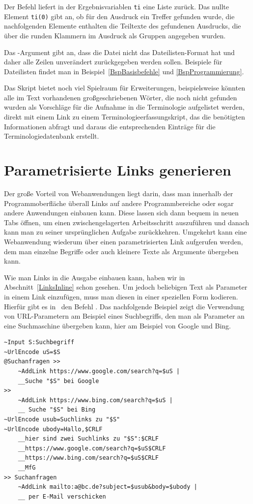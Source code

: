 Der Befehl  liefert in der Ergebnisvariablen \verb|ti| eine Liste zurück. Das nullte Element \verb|ti(0)| gibt an, ob für den Ausdruck ein Treffer gefunden wurde, die nachfolgenden Elemente enthalten die Teiltexte des gefundenen Ausdrucks, die über die runden Klammern im Ausdruck als Gruppen angegeben wurden.

Das -Argument gibt an, dass die Datei nicht das Dateilisten-Format hat und daher alle Zeilen unverändert zurückgegeben werden sollen. Beispiele für Dateilisten findet man in Beispiel~\ref{BspBasisbefehle} und \ref{BspProgrammierung}.

Das Skript bietet noch viel Spielraum für Erweiterungen, beispielsweise könnten alle im Text vorhandenen großgeschriebenen Wörter, die noch nicht gefunden wurden als Vorschläge für die Aufnahme in die Terminologie aufgelistet werden, direkt mit einem Link zu einem Terminologieerfassungskript, das die benötigten Informationen abfragt und daraus die entsprechenden Einträge für die Terminologiedatenbank erstellt.

\section{Parametrisierte Links generieren}\label{ParametrisierteLinks}
Der große Vorteil von Webanwendungen liegt darin, dass man innerhalb der Programmoberfläche überall Links auf andere Programmbereiche oder sogar andere Anwendungen einbauen kann. Diese lassen sich dann bequem in neuen Tabs öffnen, um einen zwischengelagerten Arbeitsschritt auszuführen und danach kann man zu seiner ursprünglichen Aufgabe zurückkehren. Umgekehrt kann eine Webanwendung wiederum über einen parametrisierten Link aufgerufen werden, dem man einzelne Begriffe oder auch kleinere Texte als Argumente übergeben kann.

Wie man Links in die Ausgabe einbauen kann, haben wir in Abschnitt~\ref{LinksInline} schon gesehen. Um jedoch beliebigen Text als Parameter in einem Link einzufügen, muss man diesen in einer speziellen Form kodieren. Hierfür gibt es in \FPZ\ den Befehl . Das nachfolgende Beispiel zeigt die Verwendung von URL-Parametern am Beispiel eines Suchbegriffs, den man als Parameter an eine Suchmaschine übergeben kann, hier am Beispiel von Google und Bing.

\label{BspSuchlink}
\begin{verbatim}
~Input S:Suchbegriff
~UrlEncode uS=$S
@Suchanfragen >>
    ~AddLink https://www.google.com/search?q=$uS |
    __Suche "$S" bei Google
>>
    ~AddLink https://www.bing.com/search?q=$uS |
    __ Suche "$S" bei Bing
~UrlEncode usub=Suchlinks zu "$S"
~UrlEncode ubody=Hallo,$CRLF
    __hier sind zwei Suchlinks zu "$S":$CRLF
    __https://www.google.com/search?q=$uS$CRLF
    __https://www.bing.com/search?q=$uS$CRLF
    __MfG
>> Suchanfragen
    ~AddLink mailto:a@bc.de?subject=$usub&body=$ubody |
    __ per E-Mail verschicken
\end{verbatim}

